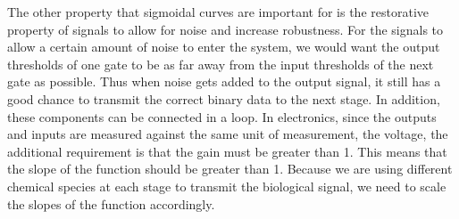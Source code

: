 \documentclass{article}
\begin{document}
The other property that sigmoidal curves are important for is the restorative property of signals to allow for noise and increase robustness.  For the signals to allow a certain amount of noise to enter the system, we would want the output thresholds of one gate to be as far away from the input thresholds of the next gate as possible.  Thus when noise gets added to the output signal, it still has a good chance to transmit the correct binary data to the next stage.  In addition, these components can be connected in a loop.  In electronics, since the outputs and inputs are measured against the same unit of measurement, the voltage, the additional requirement is that the gain must be greater than 1.  This means that the slope of the function should be greater than 1.  Because we are using different chemical species at each stage to transmit the biological signal, we need to scale the slopes of the function accordingly.  
\newline \newline
\end{document}

